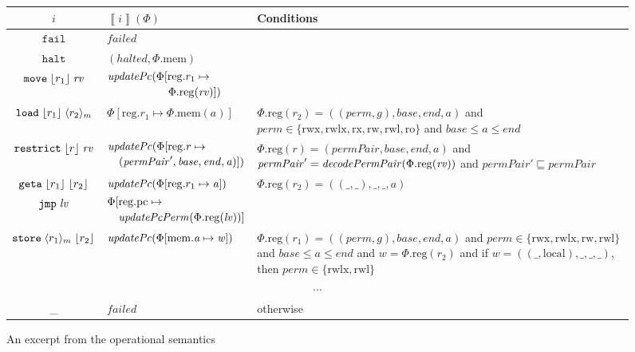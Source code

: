\documentclass[compsoc,conference,letterpaper,fleqn]{IEEEtran}
\newcommand{\update}[2]{[#1 \mapsto #2]}
\newcommand{\sem}[1]{\left\llbracket #1 \right\rrbracket}
\newcommand{\var}[1]{\mathit{#1}}
\newcommand{\rv}{\var{rv}}
\newcommand{\lv}{\var{lv}}
\newcommand{\gl}{\var{g}}
\newcommand{\pcreg}{\mathrm{pc}}
\newcommand{\addr}{\var{a}}
\newcommand{\start}{\var{base}}
\newcommand{\addrend}{\var{end}}
\newcommand{\perm}{\var{perm}}
\newcommand{\permp}{\var{permPair}}
\newcommand{\stdcap}[1][(\perm,\gl)]{\left(#1,\start,\addrend,\addr \right)}
\newcommand{\plainproj}[1]{\mathrm{#1}}
\newcommand{\memheap}[1][\Phi]{#1.\plainproj{mem}}
\newcommand{\memreg}[1][\Phi]{#1.\plainproj{reg}}
\newcommand{\updateHeap}[3][\Phi]{#1\update{\plainproj{mem}.#2}{#3}}
\newcommand{\updateReg}[3][\Phi]{#1\update{\plainproj{reg}.#2}{#3}}
\newcommand{\failed}{\mathit{failed}}
\newcommand{\halted}{\mathit{halted}}
\newcommand{\plainfun}[2]{
  \ifthenelse{\equal{#2}{}}
  {\mathit{#1}}
  {\mathit{#1}(#2)}
}
\newcommand{\decodePermPair}{\plainfun{decodePermPair}}
\newcommand{\updatePcPerm}[1]{\plainfun{updatePcPerm}{#1}}
\newcommand{\stdUpdatePc}[1]{\plainfun{updatePc}{#1}}
\newcommand{\refreg}[1]{\lfloor #1 \rfloor}
\newcommand{\refheap}[1]{\langle #1 \rangle_m}
\newcommand{\zinstr}[1]{\mathtt{#1}}
\newcommand{\fail}{\zinstr{fail}}
\newcommand{\halt}{\zinstr{halt}}
\newcommand{\oneinstr}[2]{
  \ifthenelse{\equal{#2}{}}
  {\zinstr{#1}}
  {\zinstr{#1} \; #2}
}
\newcommand{\jmp}[1]{\oneinstr{jmp}{#1}}
\newcommand{\twoinstr}[3]{
  \ifthenelse{\equal{#2#3}{}}
  {\zinstr{#1}}
  {\zinstr{#1} \; #2 \; #3}
}
\newcommand{\restricttwo}[2]{\twoinstr{restrict}{#1}{#2}}
\newcommand{\geta}[2]{\twoinstr{geta}{#1}{#2}}
\newcommand{\move}[2]{\twoinstr{move}{#1}{#2}}
\newcommand{\store}[2]{\twoinstr{store}{#1}{#2}}
\newcommand{\load}[2]{\twoinstr{load}{#1}{#2}}
\newcommand{\plainperm}[1]{\mathrm{#1}}
\newcommand{\readonly}{\plainperm{ro}}
\newcommand{\readwrite}{\plainperm{rw}}
\newcommand{\exec}{\plainperm{rx}}
\newcommand{\rwx}{\plainperm{rwx}}
\newcommand{\readwritel}{\plainperm{rwl}}
\newcommand{\rwlx}{\plainperm{rwlx}}
\newcommand{\local}{\plainperm{local}}
\begin{document}
\begin{figure}
  \begin{tabular}{|c|p{3.8cm}|p{10.4cm}|}
    \hline
    $i$&$\sem{i}(\Phi)$&Conditions\\
    \hline
    $\fail$&$\failed$&\\
    \hline
    $\halt$&$(\halted,\memheap)$&\\
    \hline
    $\move{\refreg{r_1}}{\rv}$& $\begin{multlined}
      \stdUpdatePc{}(\updateReg{r_1}{\\
          \memreg(\rv)}) \end{multlined}$&\\
    \hline
    $\load{\refreg{r_1}}{\refheap{r_2}}$&$\updateReg{r_1}{\memheap(\addr)}$&$\memreg(r_2) = \stdcap$ and $\perm \in \{ \rwx, \rwlx, \exec, \readwrite, \readwritel, \readonly \}$  and  $\start \leq \addr \leq \addrend$\\
    \hline
    $\restricttwo{\refreg{r}}{\rv}$&$\begin{multlined}
                                       \stdUpdatePc{}(\updateReg{r}{\\(\permp',\start,\addrend,\addr)})
                                     \end{multlined}$  &
                                                        $\memreg(r) = \stdcap[\permp]$ and $\permp' = \decodePermPair{\memreg(\rv)}$
                                                      and $\permp'\sqsubseteq \permp$\\
    \hline
    $\geta{\refreg{r_1}}{\refreg{r_2}}$ & $\stdUpdatePc{\updateReg{r_1}{\addr}}$ &
                                                $\memreg(r_2) = ((\_,\_),\_,\_,\addr)$\\
    \hline
    $\jmp{\lv}$&$\begin{multlined}
                   \updateReg{\pcreg}{\\\updatePcPerm{\memreg(\lv)}}
                 \end{multlined}$&\\
    \hline
    $\store{\refheap{r_1}}{\refreg{r_2}}$&$\stdUpdatePc{\updateHeap{\addr}{\var{w}}}$&$\memreg(r_1) = \stdcap$ and $\perm \in \{ \rwx, \rwlx, \readwrite, \readwritel\}$  and  $\start \leq \addr \leq \addrend$ and $\var{w} = \memreg(r_2)$
                                                                                       and if  $\var{w} = ((\_,\local),\_,\_,\_)$, then  $\perm \in \{\rwlx,\readwritel \}$\\
    \hline
    \multicolumn{3}{|c|}{$\cdots$}\\
    \hline
    \_&$\failed$&otherwise\\
    \hline
  \end{tabular}
  \caption{An excerpt from the operational semantics}
  \label{fig:op-sem}
\end{figure}
\end{document}

